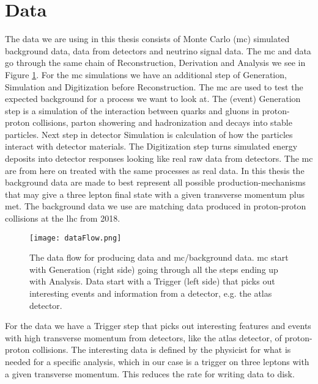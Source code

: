 \documentclass[a4paper, american, 12pt]{report}
\begin{document}
	
	\section{Data}
	\label{sect:Method-Data}
	The data we are using in this thesis consists of Monte Carlo (\acrshort{mc}) simulated background data, data from detectors and neutrino signal data. The \acrshort{mc} and data go through the same chain of Reconstruction, Derivation and Analysis we see in Figure \ref{fig:DataFlow}. For the \acrshort{mc} simulations we have an additional step of Generation, Simulation and Digitization before Reconstruction. The \acrshort{mc} are used to test the expected background for a process we want to look at. The (event) Generation step is a simulation of the interaction between quarks and gluons in proton-proton collisions, parton showering and hadronization and decays into stable particles. Next step in detector Simulation is calculation of how the particles interact with detector materials. The Digitization step turns simulated energy deposits into detector responses looking like real raw data from detectors. The \acrshort{mc} are from here on treated with the same processes as real data. In this thesis the background data are made to best represent all possible production-mechanisms that may give a three lepton final state with a given transverse momentum plus \acrshort{met}. The background data we use are matching data produced in proton-proton collisions at the \acrshort{lhc} from 2018. 
	\begin{figure}[htb!]
		\hspace*{-0.8cm}
		\centering\texttt{[image: dataFlow.png]}
		\caption[Data flow for producing data and \acrshort{mc}.]{The data flow for producing data and \acrshort{mc}/background data. \acrshort{mc} start with Generation (right side) going through all the steps ending up with Analysis. Data start with a Trigger (left side) that picks out interesting events and information from a detector, e.g. the \acrshort{atlas} detector. \label{fig:DataFlow}}
	\end{figure}

	For the data we have a Trigger step that picks out interesting features and events with high transverse momentum from detectors, like the \acrshort{atlas} detector, of proton-proton collisions. The interesting data is defined by the physicist for what is needed for a specific analysis, which in our case is a trigger on three leptons with a given transverse momentum. This reduces the rate for writing data to disk. 
	
\end{document}
